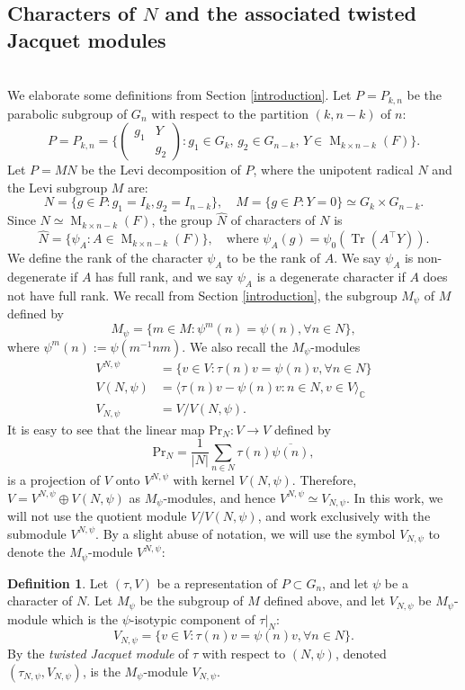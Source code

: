 \documentclass[reqno]{amsart}
\theoremstyle{definition}
\newtheorem{definition}[theorem]{Definition}
\theoremstyle{remark}
\numberwithin{equation}{section}
\DeclareMathOperator{\M}{M}
\DeclareMathOperator{\tr}{Tr}
\newcommand{\bbsm}{\left (\begin{smallmatrix}}      \newcommand{\besm}{\end{smallmatrix}\right )}
\begin{document}
\subsection{Characters of $N$ and the associated twisted Jacquet modules} \label{sec_TJM_def} \hfill \\
We  elaborate some definitions from Section \ref{introduction}. Let $P=P_{k,n}$ be the  parabolic subgroup of $G_n$ with respect to the partition $(k,n-k)$ of $n$:
 \[P=P_{k,n}=\{\bbsm g_1 & Y \\ & g_2 \besm : g_1 \in G_k, \,g_2 \in G_{n-k}, \,Y \in \M_{k \times n-k}(F) \}. \]
Let $P=MN$ be the  Levi decomposition of $P$, where the unipotent radical $N$ and the Levi subgroup $M$ are:
\[ N=\{ g \in P \colon g_1=I_k, g_2=I_{n-k}\}, \quad M=\{g \in P \colon Y=0\} \simeq G_k \times G_{n-k}.\]
 Since $N \simeq \M_{k \times n-k}(F)$, the   group $\widehat{N}$ of characters of $N$ is 
 \[ \widehat N=\{\psi_A \colon A \in \M_{k \times n-k}(F)\}, \quad \text{where    }  \psi_A(g)=\psi_0(\tr(A^\top Y)).\] We define the rank of the  character $\psi_A$ to be the rank of $A$. We say $\psi_A$ is  non-degenerate if $A$ has full rank, and we say $\psi_A$ is a degenerate character if $A$ does not have full rank.   We recall from Section \ref{introduction}, the subgroup $M_\psi$ of $M$ defined by 
\[M_{\psi} = \{m \in M \colon {\psi}^{m}(n)=\psi(n) , \forall n \in N \},\]
where $\psi^m(n):=\psi(m^{-1}nm)$. We also recall the $M_\psi$-modules
\begin{align*}
    V^{N, \psi} & =\{v \in V \colon \tau(n)v=\psi(n)v, \forall n \in N \}\\
    V(N,\psi) &= \langle \tau(n)v-\psi(n)v \colon n\in N, v\in V \rangle_{\mathbb{C}} \\
    V_{N,\psi}&=V/V(N,\psi). 
\end{align*}
It is easy to see that the linear map Pr$_N:V \to V$ defined by \[ \text{Pr}_N = \frac{1}{|N|} \sum_{n\in N} \tau(n) \overline{\psi(n)},\] is a projection of $V$ onto $V^{N, \psi}$ with kernel $V(N, \psi)$. Therefore, $V=V^{N,\psi} \oplus V(N, \psi)$ as $M_\psi$-modules, and hence $V^{N,\psi} \simeq V_{N,\psi}$. In this work, we will not use the quotient module $V/V(N,\psi)$,  and work exclusively with the submodule $V^{N,\psi}$. By a slight abuse of notation, we will use the symbol $V_{N,\psi}$ to denote the $M_\psi$-module  $V^{N,\psi}$:
\begin{definition} \label{V_N_psi_def}
    Let  $(\tau,V)$ be a  representation of $P\subset G_n$, and let  $\psi$ be a character of $N$. Let
    $M_\psi$ be the subgroup of $M$ defined above, and let $V_{N,\psi}$ be $M_\psi$-module which is the $\psi$-isotypic component of $\tau|_{N}$:
\[V_{N,\psi}= \{v \in V \colon \tau(n)v=\psi(n)v, \forall n \in N \}.\]
 By the \emph{twisted Jacquet module} of $\tau$ with respect to $(N,\psi)$, denoted $(\tau_{N,\psi}, V_{N,\psi})$, is the $M_\psi$-module $V_{N,\psi}$.
\end{definition}
\end{document}

